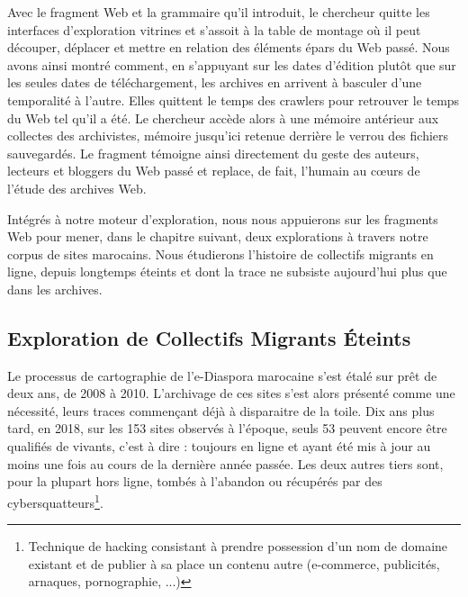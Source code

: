\documentclass[symmetric,justified,marginals=raggedouter]{tufte-book}
\begin{document}
Avec le fragment Web et la grammaire qu'il introduit, le chercheur quitte les interfaces d'exploration vitrines et s'assoit à la table de montage où il peut découper, déplacer et mettre en relation des éléments épars du Web passé. Nous avons ainsi montré comment, en s'appuyant sur les dates d'édition plutôt que sur les seules dates de téléchargement, les archives en arrivent à basculer d'une temporalité à l'autre. Elles quittent le temps des crawlers pour retrouver le temps du Web tel qu'il a été. Le chercheur accède alors à une mémoire antérieur aux collectes des archivistes, mémoire jusqu'ici retenue derrière le verrou des fichiers sauvegardés. Le fragment témoigne ainsi directement du geste des auteurs, lecteurs et bloggers du Web passé et replace, de fait, l'humain au cœurs de l'étude des archives Web.

Intégrés à notre moteur d'exploration, nous nous appuierons sur les fragments Web pour mener, dans le chapitre suivant, deux explorations à travers notre corpus de sites marocains. Nous étudierons l'histoire de collectifs migrants en ligne, depuis longtemps éteints et dont la trace ne subsiste aujourd'hui plus que dans les archives.  



\cleardoublepage
\begin{minipage}[t,leftmargin=5em]{1.5\linewidth}%
\begin{adjustwidth}{-0.5cm}{}
\chapter{Exploration de Collectifs Migrants Éteints} 
\label{chap:6}
\end{adjustwidth}
\end{minipage}
\hfill

\noindent Le processus de cartographie de l'e-Diaspora marocaine s'est étalé sur prêt de deux ans, de 2008 à 2010. L'archivage de ces sites s'est alors présenté comme une nécessité, leurs traces commençant déjà à disparaitre de la toile. Dix ans plus tard, en 2018, sur les 153 sites observés à l'époque, seuls 53 peuvent encore être qualifiés de vivants, c'est à dire : toujours en ligne et ayant été mis à jour au moins une fois au cours de la dernière année passée. Les deux autres tiers sont, pour la plupart hors ligne, tombés à l'abandon ou récupérés par des cybersquatteurs\footnote{Technique de hacking consistant à prendre possession d'un nom de domaine existant et de publier à sa place un contenu autre (e-commerce, publicités, arnaques, pornographie, ...)}.      
\end{document}
